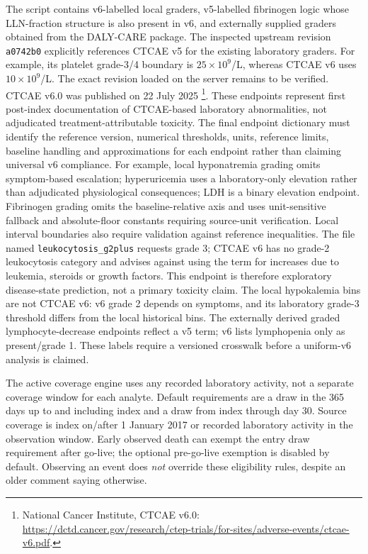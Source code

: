 \documentclass[10pt]{article}
\begin{document}
The script contains v6-labelled local graders, v5-labelled fibrinogen logic
whose LLN-fraction structure is also present in v6, and externally supplied
graders obtained from the DALY-CARE package. The inspected upstream revision
\texttt{a0742b0} explicitly references CTCAE v5 for the existing laboratory
graders. For example, its platelet grade-3/4 boundary is
$25\times10^9$/L, whereas CTCAE v6 uses $10\times10^9$/L. The exact
revision loaded on the server remains to be verified.
CTCAE v6.0 was published on 22 July 2025
\footnote{National Cancer Institute, CTCAE v6.0:
\url{https://dctd.cancer.gov/research/ctep-trials/for-sites/adverse-events/ctcae-v6.pdf}.}.
These endpoints represent first post-index documentation of CTCAE-based
laboratory abnormalities, not adjudicated treatment-attributable toxicity.
The final endpoint dictionary must identify the reference version, numerical
thresholds, units, reference limits, baseline handling and approximations for
each endpoint rather than claiming universal v6 compliance.
For example, local hyponatremia grading omits symptom-based escalation;
hyperuricemia uses a laboratory-only elevation rather than adjudicated
physiological consequences; LDH is a binary elevation endpoint.
Fibrinogen grading omits the baseline-relative axis and uses unit-sensitive
fallback and absolute-floor constants requiring source-unit verification.
Local interval boundaries also require validation against reference inequalities.
The file named \texttt{leukocytosis\_g2plus} requests grade 3; CTCAE v6 has no
grade-2 leukocytosis category and advises against using the term for increases
due to leukemia, steroids or growth factors. This endpoint is therefore
exploratory disease-state prediction, not a primary toxicity claim.
The local hypokalemia bins are not CTCAE v6: v6 grade 2 depends on symptoms,
and its laboratory grade-3 threshold differs from the local historical bins.
The externally derived graded lymphocyte-decrease endpoints reflect a v5 term;
v6 lists lymphopenia only as present/grade 1. These labels require a versioned
crosswalk before a uniform-v6 analysis is claimed.

The active coverage engine uses any recorded laboratory activity, not a
separate coverage window for each analyte. Default requirements are a draw in
the 365 days up to and including index and a draw from index through day 30.
Source coverage is index on/after 1 January 2017 or recorded laboratory
activity in the observation window. Early observed death can exempt the entry
draw requirement after go-live; the optional pre-go-live exemption is disabled
by default. Observing an event does \emph{not} override these eligibility rules,
despite an older comment saying otherwise.
\end{document}
